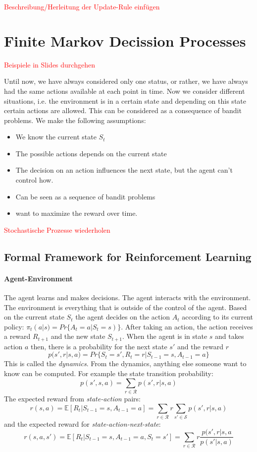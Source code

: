 \documentclass[10pt,a4paper]{article}
\begin{document}
\textcolor{red}{Beschreibung/Herleitung der Update-Rule einfügen}

\section{Finite Markov Decission Processes}
\textcolor{red}{Beispiele in Slides durchgehen}

Until now, we have always considered only one status, or rather, we have always had the same actions available at each point in time. Now we consider different situations, i.e. the environment is in a certain state and depending on this state certain actions are allowed.
This can be considered as a consequence of bandit problems. We make the following assumptions:
\begin{itemize}
\item We know the current state $S_t$
\item The possible actions depends on the current state
\item The decision on an action influences the next state, but the agent can't control how.
\item Can be seen as a sequence of bandit problems
\item want to maximize the reward over time.
\end{itemize}
\textcolor{red}{Stochastische Prozesse wiederholen}

\subsection{Formal Framework for Reinforcement Learning}
\paragraph{Agent-Environment}


The agent learns and makes decisions. The agent interacts with the environment. The environment is everything that is outside of the control of the agent. Based on the current state $S_t$ the agent decides on the action $A_t$ according to its current policy: $\pi_t(a | s) = Pr \{ A_t = a | S_t = s) \}$. After taking an action, the action receives a reward $R_{t+1}$ and the new state $S_{t+1}$.
When the agent is in state $s$ and takes action $a$ then, there is a probability for the next state $s'$ and the reward $r$
\[ p(s',r | s, a) = Pr\{ S_t=s', R_t=r | S_{t-1}=s, A_{t-1}=a \}\]
This is called the \textit{dynamics}. From the dynamics, anything else someone want to know can be computed. For example the state transition probability:
\[ p(s',s,a) = \sum_{r \in \mathcal{R}} p(s',r | s,a) \]
The expected reward from \textit{state-action} pairs:
\[ r(s,a) = \mathbb{E}[R_t | S_{t-1}=s, A_{t-1} = a] = \sum_{r \in \mathcal{R}} r \sum_{s' \in \mathcal{S}} p(s',r | s,a) \]
and the expected reward for \textit{state-action-next-state}:
\[ r(s,a,s') = \mathbb{E}[R_t | S_{t-1}=s, A_{t-1}=a, S_t=s'] = \sum_{r \in \mathcal{R}} r \frac{p(s',r | s,a}{p(s' | s,a)}\]
\end{document}
